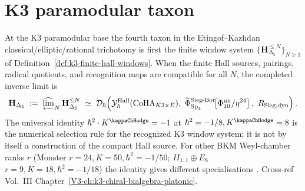 \section{K3 paramodular taxon}
\label{sec:ucqg-supplement}

\begin{remark}
\label{rem:ucqg-1}
At the K3 paramodular base the fourth taxon in the
Etingof--Kazhdan classical/elliptic/rational trichotomy is first the
finite window system
$\{\mathbf H_{\Delta_5}^{\le N}\}_{N\ge1}$ of
Definition~\ref{def:k3-finite-hall-windows}.  When the finite Hall
sources, pairings, radical quotients, and recognition maps are
compatible for all $N$, the completed inverse limit is
\[
 \mathbf H_{\Delta_5}
 \;:=\;
 \widehat{\varprojlim}_{N}\,\mathbf H_{\Delta_5}^{\le N}
 \;\simeq\;
 \mathcal D_\hbar\!\left(
 \mathcal Y^{\mathrm{Hall}}_\hbar(\operatorname{CoHA}_{K3\times E}),\
 \widetilde\Phi^{\mathrm{Sieg\text{-}Bor}}_{\mathrm{Sp}_4}\!\!\left[\Phi_{10}^{\mathrm{un}}/\eta^{24}\right],\
 R_{\mathrm{Sieg,dyn}}
 \right).
\]
The universal identity $\hbar^2\cdot K^{\kappaChHodge} = -1$ at
$\hbar^2 = -1/8, K^{\kappaChHodge} = 8$ is the numerical
selection rule for the recognized K3 window system; it is not by
itself a construction of the compact Hall source.  For other BKM
Weyl-chamber ranks $r$ (Monster $r=24, K=50, \hbar^2=-1/50$;
$II_{1,1}\oplus E_8$ $r=9, K=18, \hbar^2=-1/18$) the identity gives
different specialisations
\cite{EtingofKazhdan2007PartV,Borcherds1998,PasolZagier2013}.
Cross-ref Vol.~III Chapter~\ref{V3-ch:k3-chiral-bialgebra-platonic}.
\end{remark}
